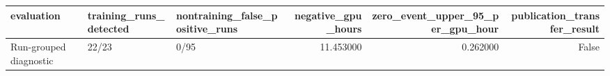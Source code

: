 \begin{tabular}{lllrrr}
\toprule
evaluation & training\_runs\_detected & nontraining\_false\_positive\_runs & negative\_gpu\_hours & zero\_event\_upper\_95\_per\_gpu\_hour & publication\_transfer\_result \\
\midrule
Run-grouped diagnostic & 22/23 & 0/95 & 11.453000 & 0.262000 & False \\
\bottomrule
\end{tabular}
